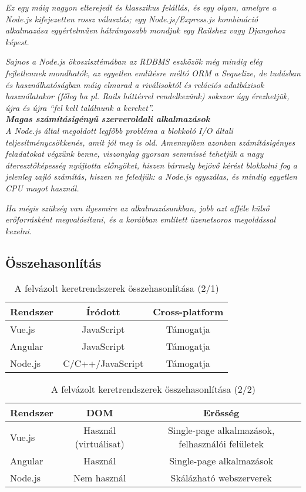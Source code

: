 \textit{Ez egy máig nagyon elterejedt és klasszikus felállás, és egy olyan, amelyre a Node.js kifejezetten rossz választás; egy Node.js/Express.js kombináció alkalmazása egyértelműen hátrányosabb mondjuk egy Railshez vagy Djangohoz képest.}

\textit{Sajnos a Node.js ökoszisztémában az RDBMS eszközök még mindig elég fejletlennek mondhatók, az egyetlen említésre méltó ORM a Sequelize, de tudásban és használhatóságban máig elmarad a riválisoktól és relációs adatbázisok használatakor (főleg ha pl. Rails háttérrel rendelkezünk) sokszor úgy érezhetjük, újra és újra “fel kell találnunk a kereket”.}\\

\noindent\textit{\textbf{Magas számításigényű szerveroldali alkalmazások}}\\

\textit{A Node.js által megoldott legfőbb probléma a blokkoló I/O általi teljesítménycsökkenés, amit jól meg is old. Amennyiben azonban számításigényes feladatokat végzünk benne, viszonylag gyorsan semmissé tehetjük a nagy áteresztőképesség nyújtotta előnyöket, hiszen bármely bejövő kérést blokkolni fog a jelenleg zajló számítás, hiszen ne feledjük: a Node.js egyszálas, és mindig egyetlen CPU magot használ.}

\textit{Ha mégis szükség van ilyesmire az alkalmazásunkban, jobb azt afféle külső erőforrásként megvalósítani, és a korábban említett üzenetsoros megoldással kezelni.}

\subsection{Összehasonlítás}

\begin{table}[h]
\centering
\caption{A felvázolt keretrendszerek összehasonlítása (2/1)}
\label{tab:minta}
\begin{tabular}{|l|c|c|}
\hline
Rendszer & Íródott & Cross-platform\\
\hline
Vue.js & JavaScript & Támogatja\\
\hline
Angular & JavaScript & Támogatja\\
\hline
Node.js & C/C++/JavaScript & Támogatja\\
\hline
\end{tabular}
\end{table}

\begin{table}[h]
\centering
\caption{A felvázolt keretrendszerek összehasonlítása (2/2)}
\label{tab:minta}
\begin{tabular}{|l|c|c|}
\hline
Rendszer & DOM & Erősség\\
\hline
Vue.js & Használ (virtuálisat) & Single-page alkalmazások, felhasználói felületek\\
\hline
Angular & Használ & Single-page alkalmazások\\
\hline
Node.js & Nem használ & Skálázható webszerverek\\
\hline
\end{tabular}
\end{table}

